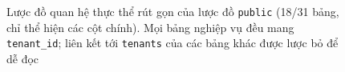 \begin{figure}[p]
  \caption[Lược đồ quan hệ thực thể rút gọn của lược đồ \texttt{public}]{Lược đồ quan hệ thực thể rút gọn của lược đồ \texttt{public} (18/31 bảng, chỉ thể hiện các cột chính). Mọi bảng nghiệp vụ đều mang \texttt{tenant\_id}; liên kết tới \texttt{tenants} của các bảng khác được lược bỏ để dễ đọc}\label{fig:erd}
\end{figure}
